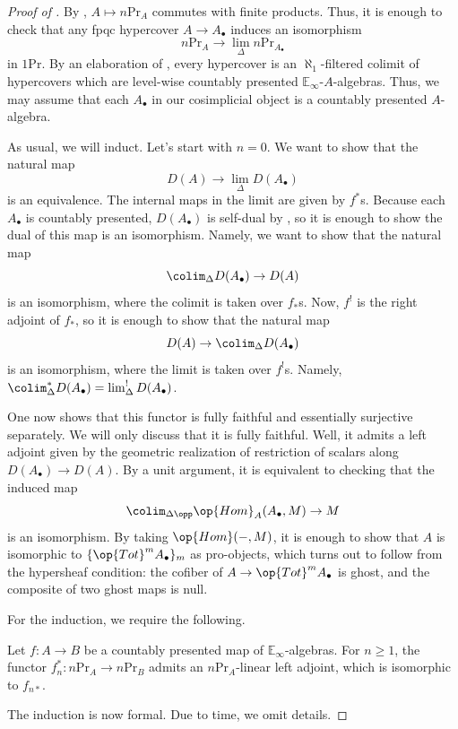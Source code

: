\documentclass[../notes.tex]{subfiles}
\begin{document}
\begin{proof}[Proof of ]
	By , $A\mapsto n\mathrm{Pr}_A$ commutes with finite products. Thus, it is enough to check that any fpqc hypercover $A\to A_\bullet$ induces an isomorphism
	\[n\mathrm{Pr}_A\to\lim_\Delta n\mathrm{Pr}_{A_\bullet}\]
	in $1\mathrm{Pr}$. By an elaboration of , every hypercover is an $\aleph_1$-filtered colimit of hypercovers which are level-wise countably presented $\mathbb E_\infty$-$A$-algebras. Thus, we may assume that each $A_\bullet$ in our cosimplicial object is a countably presented $A$-algebra.

	As usual, we will induct. Let's start with $n=0$. We want to show that the natural map
	\[D(A)\to\lim_\Delta D(A_\bullet)\]
	is an equivalence. The internal maps in the limit are given by $f^*$s. Because each $A_\bullet$ is countably presented, $D(A_\bullet)$ is self-dual by , so it is enough to show the dual of this map is an isomorphism. Namely, we want to show that the natural map
	\[\colim_\Delta D(A_\bullet)\to D(A)\]
	is an isomorphism, where the colimit is taken over $f_*$s. Now, $f^!$ is the right adjoint of $f_*$, so it is enough to show that the natural map
	\[D(A)\to\colim_\Delta D(A_\bullet)\]
	is an isomorphism, where the limit is taken over $f^!$s. Namely, $\colim_\Delta^*D(A_\bullet)=\lim^!_\Delta D(A_\bullet)$.
	
	One now shows that this functor is fully faithful and essentially surjective separately. We will only discuss that it is fully faithful. Well, it admits a left adjoint given by the geometric realization of restriction of scalars along $D(A_\bullet)\to D(A)$. By a unit argument, it is equivalent to checking that the induced map
	\[\colim_{\Delta\opp}\op{Hom}_A(A_\bullet,M)\to M\]
	is an isomorphism. By taking $\op{Hom}(-,M)$, it is enough to show that $A$ is isomorphic to $\{\op{Tot}^mA_\bullet\}_m$ as pro-objects, which turns out to follow from the hypersheaf condition: the cofiber of $A\to\op{Tot}^mA_\bullet$ is ghost, and the composite of two ghost maps is null.

	For the induction, we require the following.
	\begin{theorem}[Ambidexterity] \label{thm:ambi}
		Let $f\colon A\to B$ be a countably presented map of $\mathbb E_\infty$-algebras. For $n\ge1$, the functor $f_n^*\colon n\mathrm{Pr}_A\to n\mathrm{Pr}_B$ admits an $n\mathrm{Pr}_A$-linear left adjoint, which is isomorphic to $f_{n*}$.
	\end{theorem}
	The induction is now formal. Due to time, we omit details.
\end{proof}
\end{document}
